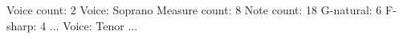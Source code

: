 Voice count: 2
Voice: Soprano
  Measure count: 8
  Note count: 18
    G-natural: 6
    F-sharp: 4
    ...
Voice: Tenor
  ...
